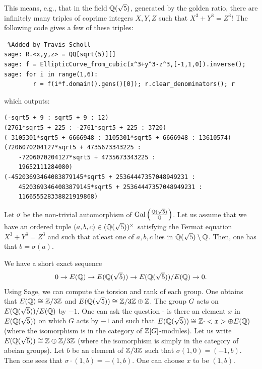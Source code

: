 \documentclass{book}
\begin{document}
This means, e.g., that in the field $\mathbb{Q}(\sqrt{5})$, generated by
the golden ratio, there are infinitely many triples of coprime integers
$X,Y,Z$ such that $X^3 + Y^3 = Z^3$! The following code gives a few of these triples:
\begin{lstlisting} %Added by Travis Scholl
sage: R.<x,y,z> = QQ[sqrt(5)][]
sage: f = EllipticCurve_from_cubic(x^3+y^3-z^3,[-1,1,0]).inverse();
sage: for i in range(1,6):
        r = f(i*f.domain().gens()[0]); r.clear_denominators(); r
\end{lstlisting}
which outputs:
\begin{lstlisting}
(-sqrt5 + 9 : sqrt5 + 9 : 12)
(2761*sqrt5 + 225 : -2761*sqrt5 + 225 : 3720)
(-3105301*sqrt5 + 6666948 : 3105301*sqrt5 + 6666948 : 13610574)
(7206070204127*sqrt5 + 4735673343225 :
    -7206070204127*sqrt5 + 4735673343225 :
    19652111284080)
(-45203693464083879145*sqrt5 + 25364447357048949231 :
    45203693464083879145*sqrt5 + 25364447357048949231 :
    116655528338821919868)
\end{lstlisting}



Let $\sigma$ be the non-trivial automorphism of $\text{Gal}\left(\frac{\mathbb{Q}(\sqrt{5})}{\mathbb{Q}}\right)$. Let us assume that we have an ordered tuple $(a,b,c) \in (\mathbb{Q}(\sqrt{5}))^\times$ satisfying the Fermat equation $X^3 + Y^3 = Z^3$ and such that atleast one of $a,b,c$ lies in $\mathbb{Q}(\sqrt{5}) \setminus  \mathbb{Q}$. Then, one has that $b= \sigma(a)$.

We have a short exact sequence
\begin{align} \label{seq}
0 \rightarrow E(\mathbb{Q}) \rightarrow E(\mathbb{Q}(\sqrt{5})) \rightarrow E(\mathbb{Q}(\sqrt{5})) / E(\mathbb{Q})  \rightarrow 0.
\end{align}
Using Sage, we can compute the torsion and rank of each group. One obtains that $E(\mathbb{Q}) \cong \mathbb{Z}/3\mathbb{Z}$ and $E(\mathbb{Q}(\sqrt{5})) \cong \mathbb{Z}/3\mathbb{Z} \oplus \mathbb{Z}$. The group $G$ acts on $E(\mathbb{Q}(\sqrt{5})) / E(\mathbb{Q})$ by $-1$. One can ask the question - is there an element $x$ in $E(\mathbb{Q}(\sqrt{5}))$ on which $G$ acts by $-1$ and such that $E(\mathbb{Q}(\sqrt{5})) \cong \mathbb{Z} \cdot <x> \oplus E(\mathbb{Q})$ (where the isomorphism is in the category of $\mathbb{Z}[G]$-modules).
Let us write $E(\mathbb{Q}(\sqrt{5})) \cong \mathbb{Z} \oplus \mathbb{Z}/3\mathbb{Z}$ (where the isomorphism is simply in the category of abeian groups).
Let $b$ be an element of $\mathbb{Z}/3\mathbb{Z}$ such that $\sigma (1,0) = (-1,b)$. Then one sees that $\sigma\cdot (1,b) = -(1,b)$.
One can choose $x$ to be $(1,b)$.
\end{document}
